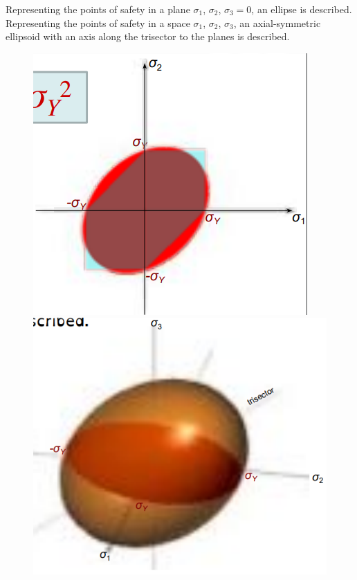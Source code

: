 \documentclass[class=report, crop=false, 12pt,a4paper]{standalone}
\begin{document}
Representing the points of safety in a plane $\sigma_1$, $\sigma_2$, $\sigma_3 = 0$, an ellipse is described. Representing the points of safety in a space $\sigma_1$, $\sigma_2$, $\sigma_3$, an axial-symmetric ellipsoid with an axis along the trisector to the planes is described.
\begin{figure}
  \begin{center}
    \begin{minipage}[b]{0.46\textwidth}
      \centering
      \includegraphics[width = \textwidth]{../img/diagram92.png}
      \caption{}
    \end{minipage}
    \begin{minipage}[b]{0.46\textwidth}
      \centering
      \includegraphics[width = \textwidth]{../img/diagram93.png}
      \caption{}
    \end{minipage}
  \end{center}
\end{figure}
\end{document}

